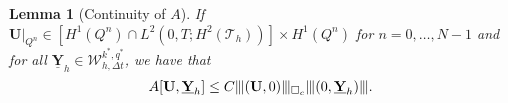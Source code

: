 \documentclass[sn-mathphys-num]{sn-jnl}
\newtheorem{lem}[thm]{Lemma}
\numberwithin{equation}{section}
\newcommand{\wop}{\square_c}
\newcommand{\tnorm}[1]{\vert\hspace{-0.3mm}\Vert#1\Vert\hspace{-0.3mm}\vert}
\newcommand{\dT}{\mathrm{d}t}
\newcommand{\ProdFullyDiscrSpace}[2]{ \mathcal{W}^{ {#1},{#2}}_{h, \Delta t  } }
\newcommand{\Yh}{\underline{\mathbf{Y}}_h}
\newcommand{\dt}{\partial_t}
\begin{document}
\begin{lem}[Continuity of $A$]\label{lem:continuityA}
If $\mathbf{U}|_{Q^n} \in [H^1(Q^n) \cap L^2(0,T;H^2(\mathcal{T}_h))] \times H^1(Q^n)$ for $n=0,\ldots,N-1$ and for all $\Yh \in \ProdFullyDiscrSpace{k^\ast}{q^\ast}$, we have that 
    \begin{equation*}
        A[\mathbf{U},\Yh] \le C \tnorm{(\mathbf{U}, 0)}_{\wop} \tnorm{(0,\Yh)}. 
    \end{equation*} 
\end{lem}
\begin{comment}
\begin{proof}
    First, note that $\tnorm{(0,\Yh)} = \Vert \Yh \Vert_{S_h^\ast}$. Using the Cauchy-Schwarz inequality, we obtain
    \begin{equation*}
        \sum_{n = 0}^{N-1} \left\{ (\dt u_2, \underline{y}_1)_{Q^n} + a(u_1,\underline{y}_1)_{Q^n} \right\} \le C \left( \sum_{n = 0}^{N-1} \Vert \dt u_2 \Vert^2_{Q^n} + \Vert c^2 \nabla u_1 \Vert^2_{Q^n} \right)^{1/2} \! \! \! \Vert \Yh \Vert_{S_h^{\ast}},
    \end{equation*}
    and 
    \begin{equation*}
        \sum_{n = 0}^{N-1} (\dt u_1 - u_2,\underline{y}_2)_{Q^n} \le C \left( \sum_{n = 0}^{N-1} \Vert \dt u_1 \Vert^2_{Q^n} + \Vert u_2 \Vert^2_{Q^n} \right)^{1/2} \Vert \Yh \Vert_{S_h^{\ast}}.
    \end{equation*}
    Since the interface $\Gamma$ is fitted by the triangulation, we have that $c^2 \nabla u_1 \in H^1(K)$ for each $K \in \mathcal{T}_h$. Thus, we can apply the trace inequality \eqref{eq:traceInequality} to obtain
    \begin{align*}
        \sum_{n = 0}^{N-1} (c^2 \nabla &u_1 \cdot n, \underline{y}_1)_{\Sigma^n} \\
        &\le \left( \sum_{n = 0}^{N-1} \int_{I_n} \sum_{K \in \mathcal{T}_h} h \Vert c^2 \nabla v \Vert_{\partial \Omega \cap \partial K}^2 \dT \right)^{1/2} \left( \sum_{n = 0}^{N-1} \int_{I_n} \sum_{K \in \mathcal{T}_h} h^{-1} \Vert \underline{y}_1 \Vert_{\partial \Omega \cap \partial K}^2 \dT \right)^{1/2} \\
        &\le C \left( \sum_{n = 0}^{N-1} \left\{ \Vert c^2 \nabla u_1 \Vert^2_{Q^n} + \int_{I_n} \sum_{K \in \mathcal{T}_h} h^2 \Vert c^2 u_1 \Vert_{H^2(K)} \dT \right\} \right)^{1/2} \Vert \Yh \Vert_{S_h^{\ast}}.
    \end{align*}
    Putting all estimates together, the claim follows. 
\end{proof}
\end{comment}
\end{document}
